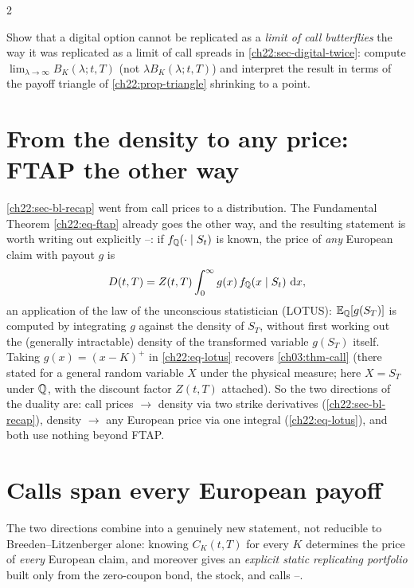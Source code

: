\begin{paracol}{2}
\begin{exercise}\label{ch22:ex-digital-butterfly}
Show that a digital option cannot be replicated as a \emph{limit of call butterflies} the way it was
replicated as a limit of call spreads in \cref{ch22:sec-digital-twice}: compute
$\lim_{\lambda\to\infty}B_K(\lambda;t,T)$ (not $\lambda B_K(\lambda;t,T)$) and interpret the result in
terms of the payoff triangle of \cref{ch22:prop-triangle} shrinking to a point.
\end{exercise}

\section{From the density to any price: FTAP the other way}\label{ch22:sec-density-to-price}

\cref{ch22:sec-bl-recap} went from call prices to a distribution. The Fundamental Theorem
\eqref{ch22:eq-ftap} already goes the other way, and the resulting statement is worth writing out
explicitly --: if $f_{\mathbb{Q}}(\cdot\mid S_t)$ is known, the price of
\emph{any} European claim with payout $g$ is
\begin{equation}\label{ch22:eq-lotus}
  D(t,T) = Z(t,T)\int_0^\infty g(x)\,f_{\mathbb{Q}}(x\mid S_t)\,\,\mathrm{d} x,
\end{equation}
an application of the law of the unconscious statistician (LOTUS): $\mathbb{E}_{\mathbb{Q}}[g(S_T)]$ is computed by
integrating $g$ against the density of $S_T$, without first working out the (generally intractable)
density of the transformed variable $g(S_T)$ itself. Taking $g(x)=(x-K)^+$ in \eqref{ch22:eq-lotus}
recovers \cref{ch03:thm-call} (there stated for a general random variable $X$ under the physical
measure; here $X=S_T$ under $\mathbb{Q}$, with the discount factor $Z(t,T)$ attached). So the two directions
of the duality are: call prices $\to$ density via two strike derivatives
(\cref{ch22:sec-bl-recap}), density $\to$ any European price via one integral
(\eqref{ch22:eq-lotus}), and both use nothing beyond FTAP.

\section{Calls span every European payoff}\label{ch22:sec-spanning}

The two directions combine into a genuinely new statement, not reducible to
Breeden--Litzenberger alone: knowing $C_K(t,T)$ for every $K$ determines the price of \emph{every}
European claim, and moreover gives an \emph{explicit static replicating portfolio} built only from
the zero-coupon bond, the stock, and calls --.


\end{paracol}
